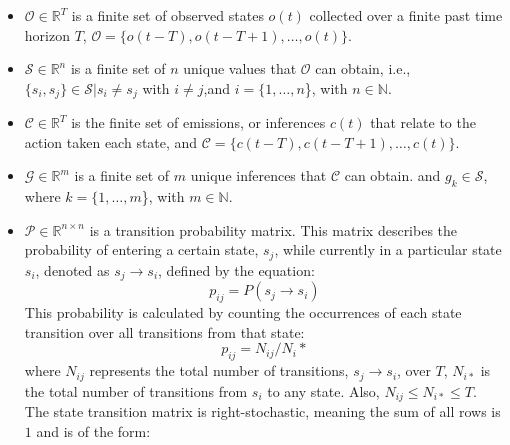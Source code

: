 \documentclass[letterpaper, 10 pt, conference]{ieeeconf}  %
\newcommand\NB[1]{$\spadesuit$\footnote{NB: #1}}
\begin{document}
\begin{itemize}
    \item $\mathcal{O}\in\mathbb{R}^T$ is a finite set of observed states $o(t)$ collected over a finite past time horizon $T$, $\mathcal{O} = \{ o(t-T), o(t-T+1), \ldots, o(t)\}$. 
    \item  $\mathcal{S}\in\mathbb{R}^n$ is a finite set of $n$ unique values that $\mathcal{O}$ can obtain, i.e., $\{s_i,s_j\} \in \mathcal{S} \vert s_i \neq s_j$ with $i\neq j$,and $i = \{1,\ldots,n$\}, with $n \in \mathbb{N}$.
    \item $\mathcal{C}\in\mathbb{R}^T$ %
    is the finite set of emissions, or inferences $c(t)$ that relate to the action taken each state, and $\mathcal{C} = \{ c(t-T), c(t-T+1), \ldots, c(t)\}$. %
    \item $\mathcal{G}\in\mathbb{R}^m$ is a finite set of $m$ unique inferences that $\mathcal{C}$ can obtain. and $g_k \in \mathcal{S}$, where $k = \{1,\ldots,m$\}, with $m \in \mathbb{N}$. 
    \item $\mathcal{P}\in\mathbb{R}^{n\times n}$ is a transition probability matrix. This matrix describes the probability of entering a certain state, $s_{j}$, while currently in a particular state $s_{i}$, denoted as $s_j \to s_i$, defined by the equation:
        \begin{equation}
            p_{ij} = P(s_j\to s_i)
        \end{equation}
        This probability is calculated by counting the occurrences of each state transition over all transitions from that state:
        \begin{equation} \label{eq:transbuild}
            p_{ij} = N_{ij}/N_{i}*
        \end{equation}
        where $N_{ij}$ represents the total number of transitions, $s_j \to s_i$, over $T$, $N_{i*}$ is the total number of transitions from $s_i$ to any state. Also, $N_{ij} \leq N_{i*} \leq T$. The state transition matrix is right-stochastic, meaning the sum of all rows is $1$ and is of the form:
        \begin{equation}

\end{equation}
\end{itemize}
\end{document}
